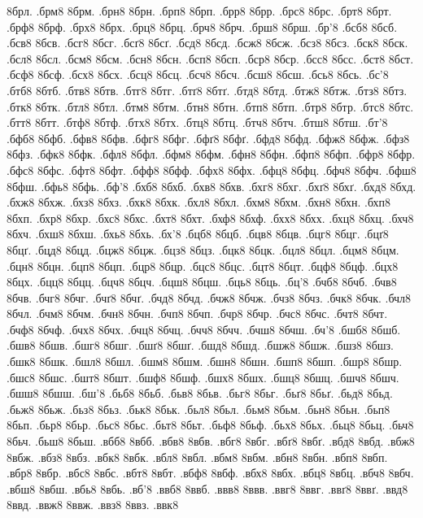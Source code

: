 {8брл.
.брм8
8брм.
.брн8
8брн.
.брп8
8брп.
.брр8
8брр.
.брс8
8брс.
.брт8
8брт.
.брф8
8брф.
.брх8
8брх.
.брц8
8брц.
.брч8
8брч.
.брш8
8брш.
.бр'8
.бсб8
8бсб.
.бсв8
8бсв.
.бсг8
8бсг.
.бсґ8
8бсґ.
.бсд8
8бсд.
.бсж8
8бсж.
.бсз8
8бсз.
.бск8
8бск.
.бсл8
8бсл.
.бсм8
8бсм.
.бсн8
8бсн.
.бсп8
8бсп.
.бср8
8бср.
.бсс8
8бсс.
.бст8
8бст.
.бсф8
8бсф.
.бсх8
8бсх.
.бсц8
8бсц.
.бсч8
8бсч.
.бсш8
8бсш.
.бсь8
8бсь.
.бс'8
.бтб8
8бтб.
.бтв8
8бтв.
.бтг8
8бтг.
.бтґ8
8бтґ.
.бтд8
8бтд.
.бтж8
8бтж.
.бтз8
8бтз.
.бтк8
8бтк.
.бтл8
8бтл.
.бтм8
8бтм.
.бтн8
8бтн.
.бтп8
8бтп.
.бтр8
8бтр.
.бтс8
8бтс.
.бтт8
8бтт.
.бтф8
8бтф.
.бтх8
8бтх.
.бтц8
8бтц.
.бтч8
8бтч.
.бтш8
8бтш.
.бт'8
.бфб8
8бфб.
.бфв8
8бфв.
.бфг8
8бфг.
.бфґ8
8бфґ.
.бфд8
8бфд.
.бфж8
8бфж.
.бфз8
8бфз.
.бфк8
8бфк.
.бфл8
8бфл.
.бфм8
8бфм.
.бфн8
8бфн.
.бфп8
8бфп.
.бфр8
8бфр.
.бфс8
8бфс.
.бфт8
8бфт.
.бфф8
8бфф.
.бфх8
8бфх.
.бфц8
8бфц.
.бфч8
8бфч.
.бфш8
8бфш.
.бфь8
8бфь.
.бф'8
.бхб8
8бхб.
.бхв8
8бхв.
.бхг8
8бхг.
.бхґ8
8бхґ.
.бхд8
8бхд.
.бхж8
8бхж.
.бхз8
8бхз.
.бхк8
8бхк.
.бхл8
8бхл.
.бхм8
8бхм.
.бхн8
8бхн.
.бхп8
8бхп.
.бхр8
8бхр.
.бхс8
8бхс.
.бхт8
8бхт.
.бхф8
8бхф.
.бхх8
8бхх.
.бхц8
8бхц.
.бхч8
8бхч.
.бхш8
8бхш.
.бхь8
8бхь.
.бх'8
.бцб8
8бцб.
.бцв8
8бцв.
.бцг8
8бцг.
.бцґ8
8бцґ.
.бцд8
8бцд.
.бцж8
8бцж.
.бцз8
8бцз.
.бцк8
8бцк.
.бцл8
8бцл.
.бцм8
8бцм.
.бцн8
8бцн.
.бцп8
8бцп.
.бцр8
8бцр.
.бцс8
8бцс.
.бцт8
8бцт.
.бцф8
8бцф.
.бцх8
8бцх.
.бцц8
8бцц.
.бцч8
8бцч.
.бцш8
8бцш.
.бць8
8бць.
.бц'8
.бчб8
8бчб.
.бчв8
8бчв.
.бчг8
8бчг.
.бчґ8
8бчґ.
.бчд8
8бчд.
.бчж8
8бчж.
.бчз8
8бчз.
.бчк8
8бчк.
.бчл8
8бчл.
.бчм8
8бчм.
.бчн8
8бчн.
.бчп8
8бчп.
.бчр8
8бчр.
.бчс8
8бчс.
.бчт8
8бчт.
.бчф8
8бчф.
.бчх8
8бчх.
.бчц8
8бчц.
.бчч8
8бчч.
.бчш8
8бчш.
.бч'8
.бшб8
8бшб.
.бшв8
8бшв.
.бшг8
8бшг.
.бшґ8
8бшґ.
.бшд8
8бшд.
.бшж8
8бшж.
.бшз8
8бшз.
.бшк8
8бшк.
.бшл8
8бшл.
.бшм8
8бшм.
.бшн8
8бшн.
.бшп8
8бшп.
.бшр8
8бшр.
.бшс8
8бшс.
.бшт8
8бшт.
.бшф8
8бшф.
.бшх8
8бшх.
.бшц8
8бшц.
.бшч8
8бшч.
.бшш8
8бшш.
.бш'8
.бьб8
8бьб.
.бьв8
8бьв.
.бьг8
8бьг.
.бьґ8
8бьґ.
.бьд8
8бьд.
.бьж8
8бьж.
.бьз8
8бьз.
.бьк8
8бьк.
.бьл8
8бьл.
.бьм8
8бьм.
.бьн8
8бьн.
.бьп8
8бьп.
.бьр8
8бьр.
.бьс8
8бьс.
.бьт8
8бьт.
.бьф8
8бьф.
.бьх8
8бьх.
.бьц8
8бьц.
.бьч8
8бьч.
.бьш8
8бьш.
.вбб8
8вбб.
.вбв8
8вбв.
.вбг8
8вбг.
.вбґ8
8вбґ.
.вбд8
8вбд.
.вбж8
8вбж.
.вбз8
8вбз.
.вбк8
8вбк.
.вбл8
8вбл.
.вбм8
8вбм.
.вбн8
8вбн.
.вбп8
8вбп.
.вбр8
8вбр.
.вбс8
8вбс.
.вбт8
8вбт.
.вбф8
8вбф.
.вбх8
8вбх.
.вбц8
8вбц.
.вбч8
8вбч.
.вбш8
8вбш.
.вбь8
8вбь.
.вб'8
.ввб8
8ввб.
.ввв8
8ввв.
.ввг8
8ввг.
.ввґ8
8ввґ.
.ввд8
8ввд.
.ввж8
8ввж.
.ввз8
8ввз.
.ввк8
}
